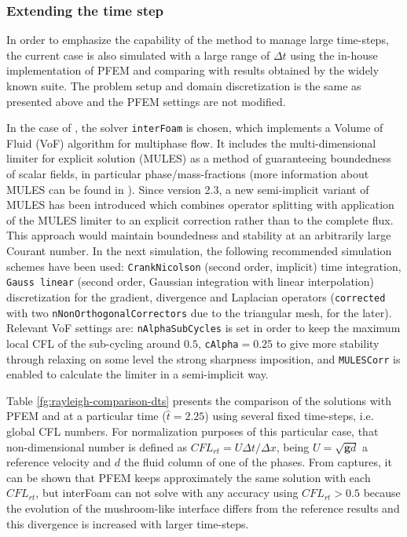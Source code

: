\subsubsection{Extending the time step}

In order to emphasize the capability of the method to manage large time-steps, the current case is also simulated with a large range of $\Delta t$ using the in-house implementation of PFEM and comparing with results obtained by the widely known \OF suite. The problem setup and domain discretization is the same as presented above and the PFEM settings are not modified.

In the case of \OF, the solver \texttt{interFoam} is chosen, which implements a Volume of Fluid (VoF) algorithm for multiphase flow\cite{Berberovic09}\cite{Marquez2014}. It includes the multi-dimensional limiter for explicit solution (MULES) as a method of guaranteeing boundedness of scalar fields, in particular phase/mass-fractions (more information about MULES can be found in \cite{Marquez13}). Since \OF version 2.3, a new semi-implicit variant of MULES has been introduced which combines operator splitting with application of the MULES limiter to an explicit correction rather than to the complete flux. This approach would maintain boundedness and stability at an arbitrarily large Courant number. In the next simulation, the following recommended simulation schemes have been used: \texttt{CrankNicolson} (second order, implicit) time integration, \texttt{Gauss linear} (second order, Gaussian integration with linear interpolation) discretization for the gradient, divergence and Laplacian operators (\texttt{corrected} with two \texttt{nNonOrthogonalCorrectors} due to the triangular mesh, for the later). Relevant VoF settings are: \texttt{nAlphaSubCycles} is set in order to keep the maximum local CFL of the sub-cycling around $0.5$, \texttt{cAlpha}$=0.25$ to give more stability through relaxing on some level the strong sharpness imposition, and \texttt{MULESCorr} is enabled to calculate the limiter in a semi-implicit way.

Table \ref{fg:rayleigh-comparison-dts} presents the comparison of the solutions with PFEM and \OF at a particular time ($\widehat{t}=2.25$) using several fixed time-steps, i.e. global CFL numbers. For normalization purposes of this particular case, that non-dimensional number is defined as $CFL_{rt}=U\Delta t/\Delta x$, being $U=\sqrt{\mathbf{g}d}$ a reference velocity and $d$ the fluid column of one of the phases. From captures, it can be shown that PFEM keeps approximately the same solution with each $CFL_{rt}$, but interFoam can not solve with any accuracy using $CFL_{rt}>0.5$
because the evolution of the mushroom-like interface differs from the reference results and this divergence is increased with larger time-steps. 


